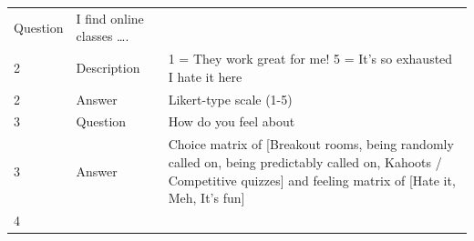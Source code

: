 \documentclass[paper=a4,justified,a4paper]{tufte-handout}
\begin{document}
\begin{longtable}[]{@{}lll@{}}
\begin{minipage}[t]{0.14\columnwidth}
Question\strut
\end{minipage} & \begin{minipage}[t]{0.68\columnwidth}\raggedright
I find online classes \ldots{}.\strut
\end{minipage}\tabularnewline
\begin{minipage}[t]{0.09\columnwidth}\raggedright
2\strut
\end{minipage} & \begin{minipage}[t]{0.14\columnwidth}\raggedright
Description\strut
\end{minipage} & \begin{minipage}[t]{0.68\columnwidth}\raggedright
1 = They work great for me! 5 = It's so exhausted I hate it here\strut
\end{minipage}\tabularnewline
\begin{minipage}[t]{0.09\columnwidth}\raggedright
2\strut
\end{minipage} & \begin{minipage}[t]{0.14\columnwidth}\raggedright
Answer\strut
\end{minipage} & \begin{minipage}[t]{0.68\columnwidth}\raggedright
Likert-type scale (1-5)\strut
\end{minipage}\tabularnewline
\begin{minipage}[t]{0.09\columnwidth}\raggedright
3\strut
\end{minipage} & \begin{minipage}[t]{0.14\columnwidth}\raggedright
Question\strut
\end{minipage} & \begin{minipage}[t]{0.68\columnwidth}\raggedright
How do you feel about\strut
\end{minipage}\tabularnewline
\begin{minipage}[t]{0.09\columnwidth}\raggedright
3\strut
\end{minipage} & \begin{minipage}[t]{0.14\columnwidth}\raggedright
Answer\strut
\end{minipage} & \begin{minipage}[t]{0.68\columnwidth}\raggedright
Choice matrix of {[}Breakout rooms, being randomly called on, being
predictably called on, Kahoots / Competitive quizzes{]} and feeling
matrix of {[}Hate it, Meh, It's fun{]}\strut
\end{minipage}\tabularnewline
\begin{minipage}[t]{0.09\columnwidth}\raggedright
4\strut
\end{minipage} & \begin{minipage}[t]{0.14\columnwidth}\raggedright

\end{minipage}
\end{longtable}
\end{document}
